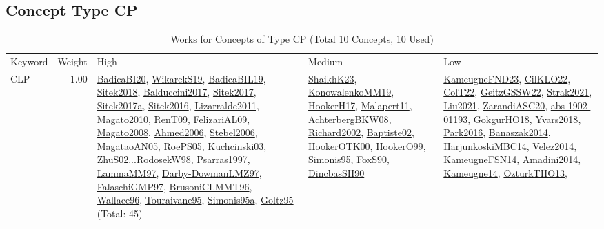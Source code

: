 \subsection{Concept Type CP}
\label{sec:CP}
\label{CP}
{\scriptsize
\begin{longtable}{p{3cm}r>{\raggedright\arraybackslash}p{6cm}>{\raggedright\arraybackslash}p{6cm}>{\raggedright\arraybackslash}p{8cm}}
\rowcolor{white}\caption{Works for Concepts of Type CP (Total 10 Concepts, 10 Used)}\\ \toprule
\rowcolor{white}Keyword & Weight & High & Medium & Low\\ \midrule\endhead
\bottomrule
\endfoot
\index{CLP}\index{CP!CLP}CLP &  1.00 & \hyperref[detail:BadicaBI20]{BadicaBI20}, \hyperref[detail:WikarekS19]{WikarekS19}, \hyperref[detail:BadicaBIL19]{BadicaBIL19}, \hyperref[detail:Sitek2018]{Sitek2018}, \hyperref[detail:Balduccini2017]{Balduccini2017}, \hyperref[detail:Sitek2017]{Sitek2017}, \hyperref[detail:Sitek2017a]{Sitek2017a}, \hyperref[detail:Sitek2016]{Sitek2016}, \hyperref[detail:Lizarralde2011]{Lizarralde2011}, \hyperref[detail:Magato2010]{Magato2010}, \hyperref[detail:RenT09]{RenT09}, \hyperref[detail:FelizariAL09]{FelizariAL09}, \hyperref[detail:Magato2008]{Magato2008}, \hyperref[detail:Ahmed2006]{Ahmed2006}, \hyperref[detail:Stebel2006]{Stebel2006}, \hyperref[detail:MagataoAN05]{MagataoAN05}, \hyperref[detail:RoePS05]{RoePS05}, \hyperref[detail:Kuchcinski03]{Kuchcinski03}, \hyperref[detail:ZhuS02]{ZhuS02}...\hyperref[detail:RodosekW98]{RodosekW98}, \hyperref[detail:Psarras1997]{Psarras1997}, \hyperref[detail:LammaMM97]{LammaMM97}, \hyperref[detail:Darby-DowmanLMZ97]{Darby-DowmanLMZ97}, \hyperref[detail:FalaschiGMP97]{FalaschiGMP97}, \hyperref[detail:BrusoniCLMMT96]{BrusoniCLMMT96}, \hyperref[detail:Wallace96]{Wallace96}, \hyperref[detail:Touraivane95]{Touraivane95}, \hyperref[detail:Simonis95a]{Simonis95a}, \hyperref[detail:Goltz95]{Goltz95} (Total: 45) & \hyperref[detail:ShaikhK23]{ShaikhK23}, \hyperref[detail:KonowalenkoMM19]{KonowalenkoMM19}, \hyperref[detail:HookerH17]{HookerH17}, \hyperref[detail:Malapert11]{Malapert11}, \hyperref[detail:AchterbergBKW08]{AchterbergBKW08}, \hyperref[detail:Richard2002]{Richard2002}, \hyperref[detail:Baptiste02]{Baptiste02}, \hyperref[detail:HookerOTK00]{HookerOTK00}, \hyperref[detail:HookerO99]{HookerO99}, \hyperref[detail:Simonis95]{Simonis95}, \hyperref[detail:FoxS90]{FoxS90}, \hyperref[detail:DincbasSH90]{DincbasSH90} & \hyperref[detail:KameugneFND23]{KameugneFND23}, \hyperref[detail:CilKLO22]{CilKLO22}, \hyperref[detail:ColT22]{ColT22}, \hyperref[detail:GeitzGSSW22]{GeitzGSSW22}, \hyperref[detail:Strak2021]{Strak2021}, \hyperref[detail:Liu2021]{Liu2021}, \hyperref[detail:ZarandiASC20]{ZarandiASC20}, \hyperref[detail:abs-1902-01193]{abs-1902-01193}, \hyperref[detail:GokgurHO18]{GokgurHO18}, \hyperref[detail:Yvars2018]{Yvars2018}, \hyperref[detail:Park2016]{Park2016}, \hyperref[detail:Banaszak2014]{Banaszak2014}, \hyperref[detail:HarjunkoskiMBC14]{HarjunkoskiMBC14}, \hyperref[detail:Velez2014]{Velez2014}, \hyperref[detail:KameugneFSN14]{KameugneFSN14}, \hyperref[detail:Amadini2014]{Amadini2014}, \hyperref[detail:Kameugne14]{Kameugne14}, \hyperref[detail:OzturkTHO13]{OzturkTHO13}, 
\end{longtable}}
